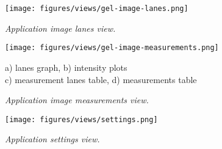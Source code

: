\begin{figure}[ht]
    \centering
    \texttt{[image: figures/views/gel-image-lanes.png]}
    \caption{\textit{Application image lanes view.}}
    \label{fig:gel-image-lanes}
\end{figure}

\begin{figure}[ht]
    \centering
    \texttt{[image: figures/views/gel-image-measurements.png]}
    \caption[\textit{Application image measurements view.}]%
    {\textit{Application image measurements view.}}
    {\small {a) lanes graph}, {b) intensity plots}} \\
    {\small {c) measurement lanes table}, {d) measurements table}}
    \label{fig:gel-image-measurements}
\end{figure}

\begin{figure}[ht]
    \centering
    \texttt{[image: figures/views/settings.png]}
    \caption{\textit{Application settings view.}}
    \label{fig:settings}
\end{figure}

